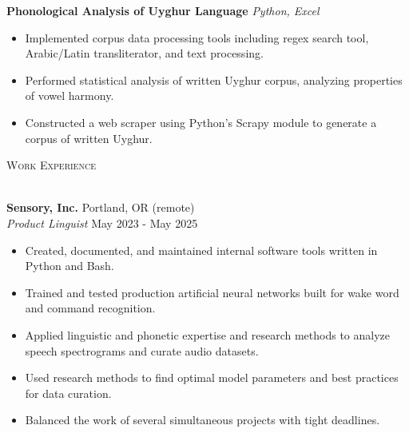 \documentclass[]{article}
\newcommand{\lineunder} {
	\vspace*{-8pt} \\
	\hspace*{-18pt} \hrulefill \\
}
\newcommand{\header} [1] {
	{\hspace*{-18pt}\vspace*{6pt} \textsc{#1}}
	\vspace*{-6pt} \lineunder
}
\begin{document}
	{\textbf{Phonological Analysis of Uyghur Language}} \hfill {\sl Python, Excel}
	\vspace*{-5pt}\begin{itemize}	\itemsep 0pt 
		\item Implemented corpus data processing tools including regex search tool, Arabic/Latin transliterator, and text processing.
		\item Performed statistical analysis of written Uyghur corpus, analyzing properties of vowel harmony.
		\item Constructed a web scraper using Python's Scrapy module to generate a corpus of written Uyghur.
	\end{itemize}
	\vspace*{0mm}
	
	\header{Work Experience}
	\vspace{0mm}
	
	\textbf{Sensory, Inc.} \hfill Portland, OR (remote)\\
	\textit{Product Linguist} \hfill May 2023 - May 2025\\
	\vspace{-3mm}
	\begin{itemize} \itemsep 0pt
		\item Created, documented, and maintained internal software tools written in Python and Bash.
		\item Trained and tested production artificial neural networks built for wake word and command recognition.
		\item Applied linguistic and phonetic expertise and research methods to analyze speech spectrograms and curate audio datasets.
		\item Used research methods to find optimal model parameters and best practices for data curation.
		\item Balanced the work of several simultaneous projects with tight deadlines.
	\end{itemize}
	
\end{document}
